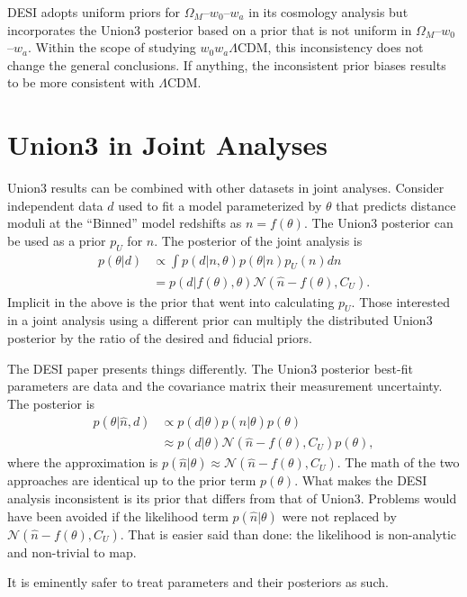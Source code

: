 \documentclass[11pt,a4paper]{article}
\begin{document}
DESI  adopts uniform priors for $\Omega_M$--$w_0$--$w_a$ in its cosmology analysis
but incorporates the Union3 posterior based on a prior that is not uniform in $\Omega_M$--$w_0$--$w_a$.
Within the scope of studying $w_0w_a\Lambda$CDM, this inconsistency does not change the general conclusions.
If anything, the inconsistent prior biases results to be more consistent with $\Lambda$CDM.

\section{Union3 in Joint Analyses}
Union3 results can be combined with other datasets in joint analyses.
Consider independent data $d$ used to fit a model parameterized by $\theta$
that predicts distance moduli at the ``Binned'' model redshifts as $n=f(\theta)$.
The Union3 posterior can be used as a prior $p_U$ for $n$.  The posterior of the joint analysis is
\begin{align}
p(\theta|d) &\propto \int  p(d|n,\theta)p(\theta|n)p_U(n) dn\\
&= p(d|f(\theta),\theta) \mathcal{N}(\hat{n}-f(\theta),C_U).
\end{align}
Implicit in the above is the prior
that went into calculating $p_U$.
Those interested in a joint analysis using a different prior can multiply the distributed Union3 posterior by the ratio of the desired
and fiducial priors.


The DESI paper presents things differently.  The Union3 posterior best-fit parameters are data and the covariance matrix
their measurement uncertainty.  The posterior is
\begin{align}
p(\theta | \hat{n}, d) & \propto p(d| \theta) p( \hat{n}| \theta) p(\theta) \\
& \approx p(d| \theta) \mathcal{N}( \hat{n}-f(\theta) , C_U) p(\theta),
\end{align}
where the approximation is $p( \hat{n}| \theta) \approx \mathcal{N}( \hat{n}-f(\theta) , C_U)$.
The math of the two approaches are identical up to the prior term $p(\theta)$.  What makes
the DESI analysis inconsistent is its  prior that differs from that of Union3.
Problems would have been avoided if the likelihood term $ p( \hat{n}| \theta)$ were not replaced by $\mathcal{N}( \hat{n}-f(\theta) , C_U)$.
That is easier said than done: the likelihood is non-analytic and non-trivial to map.

It is eminently safer to treat parameters and their posteriors as such.
\end{document}
